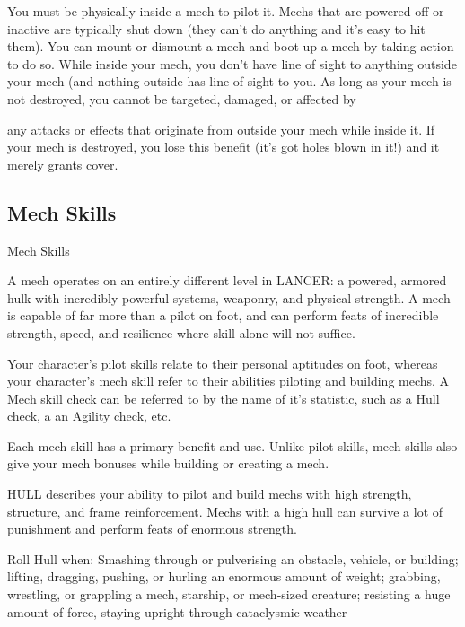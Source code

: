 You must be physically inside a mech to pilot it. Mechs that are powered off or inactive are  
typically shut down (they can’t do anything and it’s easy to hit them). You can mount or  
dismount a mech and boot up a mech by taking action to do so. While inside your mech, you  
don’t have line of sight to anything outside your mech (and nothing outside has line of sight to  
you. As long as your mech is not destroyed, you cannot be targeted, damaged, or affected by  

                                                                                                                


any attacks or effects that originate from outside your mech while inside it. If your mech is  
destroyed, you lose this benefit (it’s got holes blown in it!) and it merely grants cover.
 

\subsection{Mech Skills}
                                                  Mech Skills  

A mech operates on an entirely different level in LANCER: a powered, armored hulk with  
incredibly powerful systems, weaponry, and physical strength. A mech is capable of far more than  
a pilot on foot, and can perform feats of incredible strength, speed, and resilience where skill  
alone will not suffice.  

Your character’s pilot skills relate to their personal aptitudes on foot, whereas your character’s  
mech skill refer to their abilities piloting and building mechs. A Mech skill check can be referred to  
by the name of it’s statistic, such as a Hull check, a an Agility check, etc.  

Each mech skill has a primary benefit and use. Unlike pilot skills, mech skills also give your mech  
bonuses while building or creating a mech.  

HULL describes your ability to pilot and build mechs with high strength, structure, and frame  
reinforcement. Mechs with a high hull can survive a lot of punishment and perform feats of  
enormous strength.  

Roll Hull when: Smashing through or pulverising an obstacle, vehicle, or building; lifting, dragging,  
pushing, or hurling an enormous amount of weight; grabbing, wrestling, or grappling a mech,  
starship, or mech-sized creature; resisting a huge amount of force, staying upright through  
cataclysmic weather  

